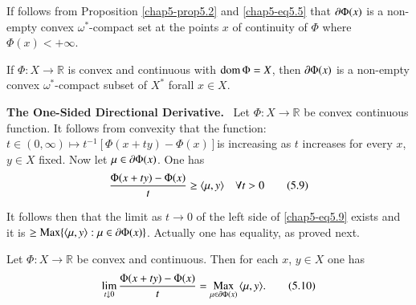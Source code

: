 \begin{remark*}
If follows from Proposition \ref{chap5-prop5.2} and
\eqref{chap5-eq5.5} that $\partial \Phi(x)$ is a non-empty convex
$\omega^{*}$-compact set at the points $x$ of continuity of $\Phi$
where $\Phi(x)<+\infty$.
\end{remark*}

\begin{corollary}\label{chap5-coro5.3}
If $\Phi:X\to \mathbb{R}$ is convex and continuous with $\operatorname{dom}\Phi=X$,
then $\partial \Phi(x)$ is a non-empty convex $\omega^{*}$-compact subset of
$X^{*}$ forall $x\in X$.
\end{corollary}

\medskip
\noindent
{\bf The One-Sided Directional Derivative.}~ Let $\Phi:X\to
\mathbb{R}$ be convex continuous function. It follows from convexity
that the function: $t\in (0,\infty)\mapsto
t^{-1}[\Phi(x+ty)-\Phi(x)]$\pageoriginale is increasing as $t$
increases for every $x$, $y\in X$ fixed. Now let $\mu\in
\partial\Phi(x)$. One has
\begin{equation*}
\frac{\Phi(x+ty)-\Phi(x)}{t}\geq \langle \mu,y\rangle\quad \forall
t>0\tag{5.9}\label{chap5-eq5.9} 
\end{equation*}

It follows then that the limit as $t\to 0$ of the left side of
\eqref{chap5-eq5.9} exists and it is $\geq \operatorname{Max}\{\langle
\mu,y\rangle:\mu\in \partial \Phi(x)\}$. Actually one has equality, as
proved next.

\begin{proposition}\label{chap5-prop5.4}
Let $\Phi:X\to \mathbb{R}$ be convex and continuous. Then for each
$x$, $y\in X$ one has
\begin{equation*}
\lim\limits_{t\downarrow 0}\frac{\Phi(x+ty)-\Phi(x)}{t}={\displaystyle\mathop{\operatorname{Max}}_{\mu\in
  \partial \Phi(x)}}\,\langle\mu,y\rangle.\tag{5.10}\label{chap5-eq5.10} 
\end{equation*}
\end{proposition}

